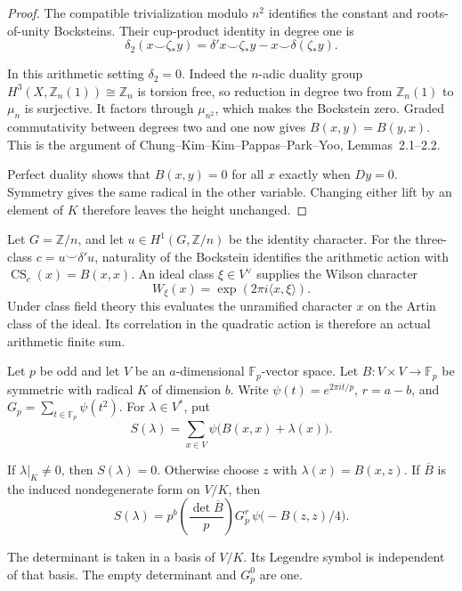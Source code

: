 \begin{proof}
The compatible trivialization modulo \(n^2\) identifies the constant and
roots-of-unity Bocksteins. Their cup-product identity in degree one is
\[
 \delta_2(x\smile\zeta_*y)
   =\delta' x\smile\zeta_*y-x\smile\delta(\zeta_*y).
\]

In this arithmetic setting \(\delta_2=0\). Indeed the \(n\)-adic duality
group \(H^3(X,\mathbb Z_n(1))\cong\mathbb Z_n\) is torsion free, so
reduction in degree two from \(\mathbb Z_n(1)\) to \(\mu_n\) is surjective.
It factors through \(\mu_{n^2}\), which makes the Bockstein zero. Graded
commutativity between degrees two and one now gives \(B(x,y)=B(y,x)\). This
is the argument of Chung--Kim--Kim--Pappas--Park--Yoo, Lemmas~2.1--2.2.

Perfect duality shows that \(B(x,y)=0\) for all \(x\) exactly when \(Dy=0\).
Symmetry gives the same radical in the other variable. Changing either lift
by an element of \(K\) therefore leaves the height unchanged.
\end{proof}

Let \(G=\mathbb Z/n\), and let \(u\in H^1(G,\mathbb Z/n)\) be the identity
character. For the three-class \(c=u\smile\delta'u\), naturality of the
Bockstein identifies the arithmetic action with
\(\operatorname{CS}_c(x)=B(x,x)\). An ideal class \(\xi\in V^\vee\) supplies
the Wilson character
\[
 W_\xi(x)=\exp(2\pi i\langle x,\xi\rangle).
\]
Under class field theory this evaluates the unramified character \(x\) on
the Artin class of the ideal. Its correlation in the quadratic action is
therefore an actual arithmetic finite sum.

\begin{theorem}
\label{v4-arith:cs:thm:gaussian}
Let \(p\) be odd and let \(V\) be an \(a\)-dimensional \(\mathbb
F_p\)-vector space. Let \(B:V\times V\to\mathbb F_p\) be symmetric with
radical \(K\) of dimension \(b\). Write \(\psi(t)=e^{2\pi it/p}\),
\(r=a-b\), and \(G_p=\sum_{t\in\mathbb F_p}\psi(t^2)\). For \(\lambda\in
V^*\), put
\[
 S(\lambda)=\sum_{x\in V}\psi\bigl(B(x,x)+\lambda(x)\bigr).
\]

If \(\lambda|_K\ne0\), then \(S(\lambda)=0\). Otherwise choose \(z\) with
\(\lambda(x)=B(x,z)\). If \(\overline B\) is the induced nondegenerate form
on \(V/K\), then
\begin{equation}
 S(\lambda)=p^b
       \left(\frac{\det\overline B}{p}\right)
       G_p^r\,\psi\bigl(-B(z,z)/4\bigr).
 \label{v4-arith:cs:eq:gaussian}
\end{equation}

The determinant is taken in a basis of \(V/K\). Its Legendre symbol is
independent of that basis. The empty determinant and \(G_p^0\) are one.
\end{theorem}

